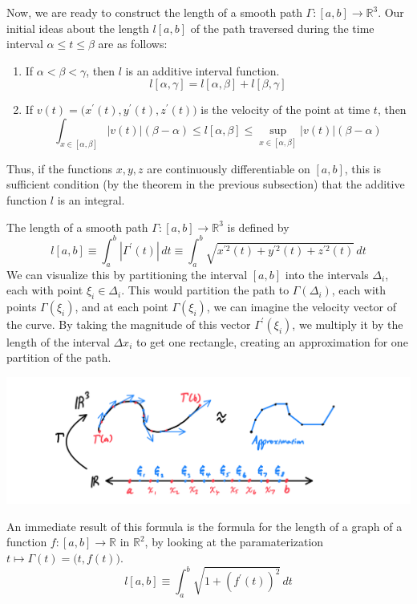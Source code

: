   Now, we are ready to construct the length of a smooth path $\Gamma: [a, b] \longrightarrow \mathbb{R}^3$. Our initial ideas about the length $l[a, b]$ of the path traversed during the time interval $\alpha \leq t \leq \beta$ are as follows: 
  \begin{enumerate}
    \item If $\alpha < \beta < \gamma$, then $l$ is an additive interval function.
    \[l[\alpha, \gamma] = l[\alpha, \beta] + l[\beta, \gamma]\]
    \item If $v(t) = \big( x^\prime (t), y^\prime (t), z^\prime (t)\big)$ is the velocity of the point at time $t$, then 
    \[\int_{x \in [\alpha, \beta]} |v(t)| (\beta - \alpha) \leq l[\alpha, \beta] \leq \sup_{x \in [\alpha, \beta]} |v(t)| (\beta - \alpha)\]
  \end{enumerate}
  Thus, if the functions $x, y, z$ are continuously differentiable on $[a, b]$, this is sufficient condition (by the theorem in the previous subsection) that the additive function $l$ is an integral.

  \begin{definition}
    The length of a smooth path $\Gamma: [a, b] \longrightarrow \mathbb{R}^3$ is defined by 
    \[l[a, b] \equiv \int_a^b |\Gamma^\prime (t)|\,dt \equiv \int_a^b \sqrt{x^{\prime 2} (t) + y^{\prime 2} (t) + z^{\prime 2} (t)}\, dt\]
    We can visualize this by partitioning the interval $[a, b]$ into the intervals $\Delta_i$, each with point $\xi_i \in \Delta_i$. This would partition the path to $\Gamma(\Delta_i)$, each with points $\Gamma(\xi_i)$, and at each point $\Gamma(\xi_i)$, we can imagine the velocity vector of the curve. By taking the magnitude of this vector $\Gamma^\prime (\xi_i)$, we multiply it by the length of the interval $\Delta x_i$ to get one rectangle, creating an approximation for one partition of the path. 
    \begin{center}
        \includegraphics[scale=0.25]{img/Arc_Length_Integral.PNG}
    \end{center}
    An immediate result of this formula is the formula for the length of a graph of a function $f: [a, b] \longrightarrow \mathbb{R}$ in $\mathbb{R}^2$, by looking at the paramaterization $t \mapsto \Gamma(t) = \big(t, f(t)\big)$. 
    \[l[a,b] \equiv \int_a^b \sqrt{1 + (f^\prime (t))^2}\,dt\]
  \end{definition}

